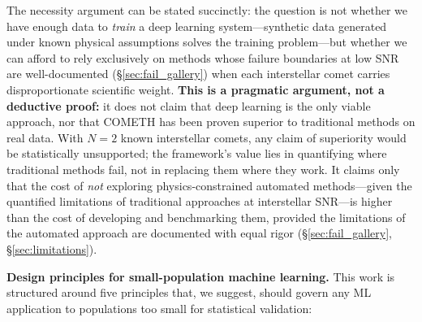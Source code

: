 \documentclass[usenatbib]{mnras}
\begin{document}
The necessity argument can be stated succinctly: the question is not whether we have enough data to \textit{train} a deep learning system---synthetic data generated under known physical assumptions solves the training problem---but whether we can afford to rely exclusively on methods whose failure boundaries at low SNR are well-documented (\S\ref{sec:fail_gallery}) when each interstellar comet carries disproportionate scientific weight. \textbf{This is a pragmatic argument, not a deductive proof:} it does not claim that deep learning is the only viable approach, nor that COMETH has been proven superior to traditional methods on real data. With $N=2$ known interstellar comets, any claim of superiority would be statistically unsupported; the framework's value lies in quantifying where traditional methods fail, not in replacing them where they work. It claims only that the cost of \textit{not} exploring physics-constrained automated methods---given the quantified limitations of traditional approaches at interstellar SNR---is higher than the cost of developing and benchmarking them, provided the limitations of the automated approach are documented with equal rigor (\S\ref{sec:fail_gallery}, \S\ref{sec:limitations}).

\textbf{Design principles for small-population machine learning.} This work is structured around five principles that, we suggest, should govern any ML application to populations too small for statistical validation:
\end{document}
